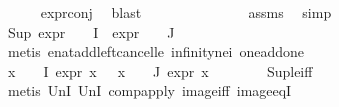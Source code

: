 \begin{isabellebody}
\ \ \ \ \isamarkupfalse%
\ expr{\isacharunderscore}{\kern0pt}{}{\isacharunderscore}{\kern0pt}conj\ \isamarkupfalse%
\ blast\isanewline
\ \ \isamarkupfalse%
\ \isamarkupfalse%
\ {\isachardoublequoteopen}{\isachardot}{\kern0pt}{\isachardot}{\kern0pt}{\isachardot}{\kern0pt}\ {\isasymle}\ {}{\isachardoublequoteclose}\ \isanewline
\ \ \ \ \isamarkupfalse%
\ assms\ \isamarkupfalse%
\ simp\isanewline
\ \ \isamarkupfalse%
\ {\isachardoublequoteopen}Sup\ {\isacharparenleft}{\kern0pt}{\isacharparenleft}{\kern0pt}expr{\isacharunderscore}{\kern0pt}{}\ {\isasymcirc}\ {\isasymPhi}{\isacharparenright}{\kern0pt}\ {\isacharbackquote}{\kern0pt}\ I\ {\isasymunion}\ {\isacharparenleft}{\kern0pt}expr{\isacharunderscore}{\kern0pt}{}\ {\isasymcirc}\ {\isasymPhi}{\isacharparenright}{\kern0pt}\ {\isacharbackquote}{\kern0pt}\ J{\isacharparenright}{\kern0pt}\ {\isasymle}\ {}{\isachardoublequoteclose}\ \isanewline
\ \ \ \ \isamarkupfalse%
\ {\isacharparenleft}{\kern0pt}metis\ enat{\isacharunderscore}{\kern0pt}add{\isacharunderscore}{\kern0pt}left{\isacharunderscore}{\kern0pt}cancel{\isacharunderscore}{\kern0pt}le\ infinity{\isacharunderscore}{\kern0pt}ne{\isacharunderscore}{\kern0pt}i{}\ one{\isacharunderscore}{\kern0pt}add{\isacharunderscore}{\kern0pt}one{\isacharparenright}{\kern0pt}\isanewline
\ \ \isamarkupfalse%
\ {\isachardoublequoteopen}{\isasymforall}x\ {\isasymin}\ {\isasymPhi}\ {\isacharbackquote}{\kern0pt}\ I{\isachardot}{\kern0pt}\ expr{\isacharunderscore}{\kern0pt}{}\ x\ {\isasymle}\ {}{\isachardoublequoteclose}\ {\isachardoublequoteopen}{\isasymforall}x\ {\isasymin}\ {\isasymPhi}\ {\isacharbackquote}{\kern0pt}\ J{\isachardot}{\kern0pt}\ expr{\isacharunderscore}{\kern0pt}{}\ x\ {\isasymle}\ {}{\isachardoublequoteclose}\isanewline
\ \ \ \ \isamarkupfalse%
\ Sup{\isacharunderscore}{\kern0pt}le{\isacharunderscore}{\kern0pt}iff\ \isanewline
\ \ \ \ \isamarkupfalse%
\ {\isacharparenleft}{\kern0pt}metis\ UnI{}\ UnI{}\ comp{\isacharunderscore}{\kern0pt}apply\ image{\isacharunderscore}{\kern0pt}iff\ image{\isacharunderscore}{\kern0pt}eqI{\isacharparenright}{\kern0pt}{\isacharplus}{\kern0pt}\isanewline
\ \ \isamarkupfalse%

\end{isabellebody}
